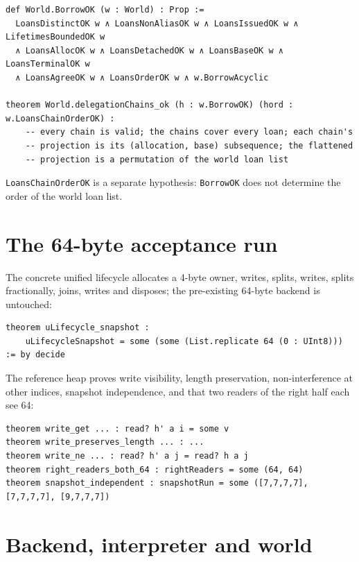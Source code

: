 \documentclass[10pt,a4paper]{article}
\newcommand{\file}[1]{\texttt{\small #1}}
\begin{document}
\begin{lstlisting}[caption={\file{Cap/Borrow.lean}, \file{Cap/Discipline.lean}, selected facts.}]
def World.BorrowOK (w : World) : Prop :=
  LoansDistinctOK w ∧ LoansNonAliasOK w ∧ LoansIssuedOK w ∧ LifetimesBoundedOK w
  ∧ LoansAllocOK w ∧ LoansDetachedOK w ∧ LoansBaseOK w ∧ LoansTerminalOK w
  ∧ LoansAgreeOK w ∧ LoansOrderOK w ∧ w.BorrowAcyclic

theorem World.delegationChains_ok (h : w.BorrowOK) (hord : w.LoansChainOrderOK) :
    -- every chain is valid; the chains cover every loan; each chain's
    -- projection is its (allocation, base) subsequence; the flattened
    -- projection is a permutation of the world loan list
\end{lstlisting}

\texttt{LoansChainOrderOK} is a separate hypothesis: \texttt{BorrowOK} does not
determine the order of the world loan list.

\section{The 64-byte acceptance run}

The concrete unified lifecycle allocates a 4-byte owner, writes, splits, writes,
splits fractionally, joins, writes and disposes; the pre-existing 64-byte backend
is untouched:

\begin{lstlisting}[caption={\file{Cap/Unified.lean}.}]
theorem uLifecycle_snapshot :
    uLifecycleSnapshot = some (some (List.replicate 64 (0 : UInt8))) := by decide
\end{lstlisting}

The reference heap proves write visibility, length preservation, non-interference
at other indices, snapshot independence, and that two readers of the right half each
see 64:

\begin{lstlisting}[caption={\file{Cap/Bytes.lean}, selected facts.}]
theorem write_get ... : read? h' a i = some v
theorem write_preserves_length ... : ...
theorem write_ne ... : read? h' a j = read? h a j
theorem right_readers_both_64 : rightReaders = some (64, 64)
theorem snapshot_independent : snapshotRun = some ([7,7,7,7], [7,7,7,7], [9,7,7,7])
\end{lstlisting}

\section{Backend, interpreter and world}
\end{document}
